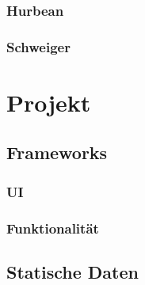 \documentclass{mrtrash}
\begin{document}
\subsection{Hurbean}

\subsection{Schweiger}


\chapter{Projekt}

\section{Frameworks}

\subsection{UI}

\subsection{Funktionalität}

\section{Statische Daten}




\end{document}

